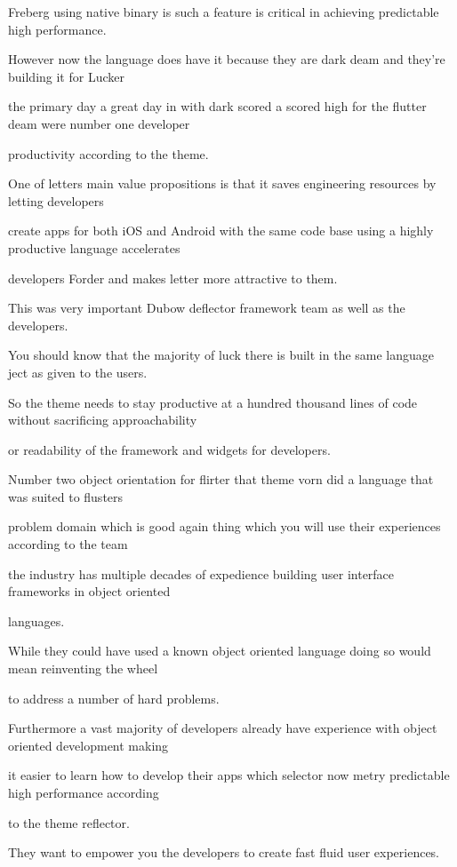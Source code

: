 Freberg using native binary is such a feature is critical in achieving predictable high performance.

However now the language does have it because they are dark deam and they're building it for Lucker

the primary day a great day in with dark scored a scored high for the flutter deam were number one developer

productivity according to the theme.

One of letters main value propositions is that it saves engineering resources by letting developers

create apps for both iOS and Android with the same code base using a highly productive language accelerates

developers Forder and makes letter more attractive to them.

This was very important Dubow deflector framework team as well as the developers.

You should know that the majority of luck there is built in the same language ject as given to the users.

So the theme needs to stay productive at a hundred thousand lines of code without sacrificing approachability

or readability of the framework and widgets for developers.

Number two object orientation for flirter that theme vorn did a language that was suited to flusters

problem domain which is good again thing which you will use their experiences according to the team

the industry has multiple decades of expedience building user interface frameworks in object oriented

languages.

While they could have used a known object oriented language doing so would mean reinventing the wheel

to address a number of hard problems.

Furthermore a vast majority of developers already have experience with object oriented development making

it easier to learn how to develop their apps which selector now metry predictable high performance according

to the theme reflector.

They want to empower you the developers to create fast fluid user experiences.

